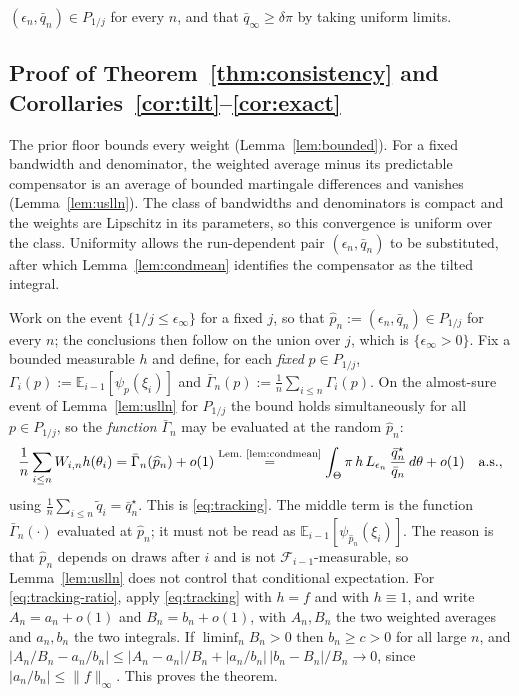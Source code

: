 \documentclass[10pt]{article}
\theoremstyle{plain}
\theoremstyle{definition}
\begin{document}
$(\epsilon_n,\bar q_n)\in P_{1/j}$ for every $n$, and that $\bar q_\infty\ge\delta\pi$ by taking uniform limits.

\subsection{Proof of Theorem~\ref{thm:consistency} and Corollaries~\ref{cor:tilt}--\ref{cor:exact}}\label{app:theory-consistency}
The prior floor bounds every weight (Lemma~\ref{lem:bounded}). For a fixed bandwidth and denominator, the weighted average minus its predictable compensator is an average of bounded martingale differences and vanishes (Lemma~\ref{lem:uslln}). The class of bandwidths and denominators is compact and the weights are Lipschitz in its parameters, so this convergence is uniform over the class. Uniformity allows the run-dependent pair $(\epsilon_n,\bar q_n)$ to be substituted, after which Lemma~\ref{lem:condmean} identifies the compensator as the tilted integral.

Work on the event $\{1/j\le\epsilon_\infty\}$ for a fixed $j$, so that $\widehat p_n:=(\epsilon_n,\bar q_n)\in P_{1/j}$ for every $n$; the conclusions then follow on the union over $j$, which is $\{\epsilon_\infty>0\}$. Fix a bounded measurable $h$ and define, for each \emph{fixed} $p\in P_{1/j}$, $\Gamma_i(p):=\mathbb{E}_{i-1}[\psi_p(\xi_i)]$ and $\bar\Gamma_n(p):=\tfrac1n\sum_{i\le n}\Gamma_i(p)$. On the almost-sure event of Lemma~\ref{lem:uslln} for $P_{1/j}$ the bound holds simultaneously for all $p\in P_{1/j}$, so the \emph{function} $\bar\Gamma_n$ may be evaluated at the random $\widehat p_n$:
\begin{equation}
\frac1n\sum_{i\le n}W_{i,n}h(\theta_i)
=\bar\Gamma_n(\widehat p_n)+o(1)
\overset{\text{Lem.\ \ref{lem:condmean}}}{=}\int_\Theta \pi\,h\,L_{\epsilon_n}\,\frac{\bar q^\star_n}{\bar q_n}\,d\theta+o(1)
\quad\text{a.s.},
\label{eq:app-consistency-main}
\end{equation}
using $\tfrac1n\sum_{i\le n}\tilde q_i=\bar q^\star_n$. This is \eqref{eq:tracking}. The middle term is the function $\bar\Gamma_n(\cdot)$ evaluated at $\widehat p_n$; it must not be read as $\mathbb{E}_{i-1}[\psi_{\widehat p_n}(\xi_i)]$. The reason is that $\widehat p_n$ depends on draws after $i$ and is not $\mathcal{F}_{i-1}$-measurable, so Lemma~\ref{lem:uslln} does not control that conditional expectation. For \eqref{eq:tracking-ratio}, apply \eqref{eq:tracking} with $h=f$ and with $h\equiv1$, and write $A_n=a_n+o(1)$ and $B_n=b_n+o(1)$, with $A_n,B_n$ the two weighted averages and $a_n,b_n$ the two integrals. If $\liminf_nB_n>0$ then $b_n\ge c>0$ for all large $n$, and $|A_n/B_n-a_n/b_n|\le|A_n-a_n|/B_n+|a_n/b_n|\,|b_n-B_n|/B_n\to0$, since $|a_n/b_n|\le\|f\|_\infty$. This proves the theorem.
\end{document}
